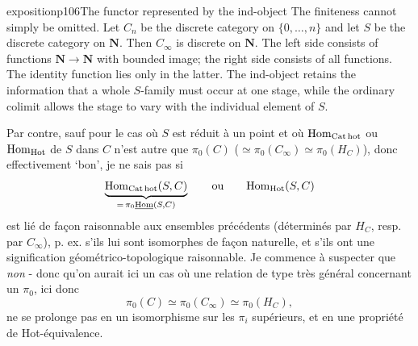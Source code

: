 \begin{dcomment}{exposition}{p106}{The functor represented by the ind-object}
The finiteness cannot simply be omitted. Let $C_n$ be the discrete category on $\{0,\ldots,n\}$ and let $S$ be the discrete category on $\mathbf N$. Then $C_\infty$ is discrete on $\mathbf N$. The left side consists of functions $\mathbf N\to\mathbf N$ with bounded image; the right side consists of all functions. The identity function lies only in the latter. The ind-object retains the information that a whole $S$-family must occur at one stage, while the ordinary colimit allows the stage to vary with the individual element of $S$.
\end{dcomment}


Par contre, sauf pour le cas où $S$ est réduit à un point et où $\mathrm{Hom}_{\mathrm{Cat\,hot}}$ ou $\mathrm{Hom}_{\mathrm{Hot}}$ de $S$ dans $C$ n'est autre que $\pi_{0}(C)$ ($\simeq \pi_{0}(C_{\infty}) \simeq \pi_{0}(H_{C})$), donc effectivement ‘bon', je ne sais pas si
\[
\underbrace{\mathrm{Hom}_{\mathrm{Cat\,hot}}(S,C)}_{=\,\pi_{0}\underline{\mathrm{Hom}}(S,C)} \qquad \text{ou} \qquad \mathrm{Hom}_{\mathrm{Hot}}(S,C)
\]
est lié de façon raisonnable aux ensembles précédents (déterminés par $H_{C}$, resp. par $C_{\infty}$), p. ex. s'ils lui sont isomorphes de façon naturelle, et s'ils ont une signification géométrico-topologique raisonnable. Je commence à suspecter que \textit{non} - donc qu'on aurait ici un cas où une relation de type très général concernant un $\pi_{0}$, ici donc
\[
\pi_{0}(C) \simeq \pi_{0}(C_{\infty}) \simeq \pi_{0}(H_{C}),
\]
ne se prolonge pas en un isomorphisme sur les $\pi_{i}$ supérieurs, et en une propriété de Hot-équivalence.


